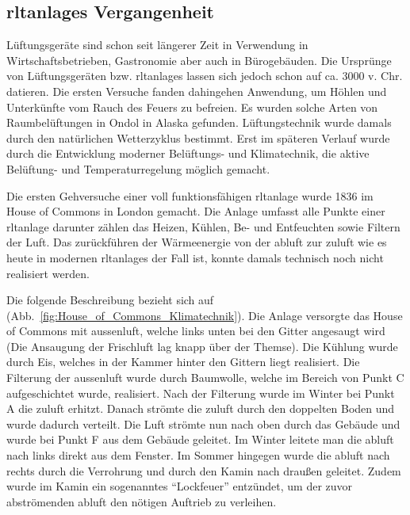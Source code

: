 \subsection{\Acp{rltanlage} Vergangenheit}
Lüftungsgeräte sind schon seit längerer Zeit in Verwendung \zB in Wirtschaftsbetrieben, Gastronomie aber auch in Bürogebäuden. Die Ursprünge von Lüftungsgeräten bzw. \acp{rltanlage} lassen sich jedoch schon auf ca. 3000 v. Chr. datieren.
Die ersten Versuche fanden dahingehen Anwendung, um Höhlen und Unterkünfte vom Rauch des Feuers zu befreien. Es wurden solche Arten von Raumbelüftungen \zB in Ondol in Alaska gefunden.
Lüftungstechnik wurde damals durch den natürlichen Wetterzyklus bestimmt. 
Erst im späteren Verlauf wurde durch die Entwicklung moderner Belüftungs- und Klimatechnik, die aktive Belüftung- und Temperaturregelung möglich gemacht.

Die ersten Gehversuche einer voll funktionsfähigen \acs{rltanlage} wurde 1836 im House of Commons in London gemacht. Die Anlage umfasst alle Punkte einer \acs{rltanlage} darunter zählen das Heizen, Kühlen, Be- und Entfeuchten sowie Filtern der Luft. Das zurückführen der Wärmeenergie von der \gls{abluft} zur \gls{zuluft} wie es heute in modernen \acp{rltanlage} der Fall ist, konnte damals technisch noch nicht realisiert werden.

Die folgende Beschreibung bezieht sich auf
(Abb.~\ref{fig:House_of_Commons_Klimatechnik}).
Die Anlage versorgte das House of Commons mit \gls{aussenluft}, welche links unten bei den Gitter angesaugt wird (Die Ansaugung der Frischluft lag knapp über der Themse). Die Kühlung wurde durch Eis, welches in der Kammer hinter den Gittern liegt realisiert.
Die Filterung der \gls{aussenluft} wurde durch Baumwolle, welche im Bereich von Punkt C aufgeschichtet wurde, realisiert.
Nach der Filterung wurde im Winter bei Punkt A die \gls{zuluft} erhitzt. 
Danach strömte die \gls{zuluft} durch den doppelten Boden und wurde dadurch verteilt. Die Luft strömte nun nach oben durch das Gebäude und wurde bei Punkt F aus dem Gebäude geleitet. Im Winter leitete man die \gls{abluft} nach links direkt aus dem Fenster. Im Sommer hingegen wurde die \gls{abluft} nach rechts durch die Verrohrung und durch den Kamin  nach draußen geleitet. Zudem wurde im Kamin ein sogenanntes \enquote{Lockfeuer} entzündet, um der zuvor abströmenden \gls{abluft} den nötigen Auftrieb zu verleihen.
\cite[vgl.][]{Fitzner_Finke:2010}


